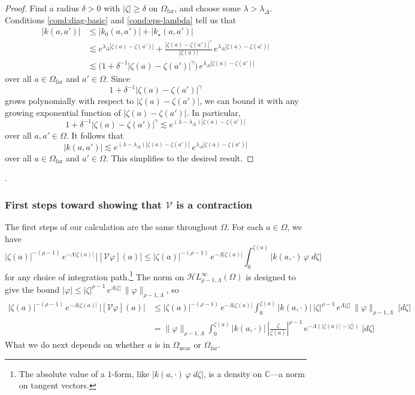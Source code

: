 \documentclass{article}
\theoremstyle{plain}
\newcommand{\C}{\mathbb{C}}
\newcommand{\singexp}[2]{\mathcal{H}L^\infty_{#1, #2}}
\newcommand{\volterra}{\mathcal{V}}
\newcommand{\kerwhole}{k}
\newcommand{\hardker}{k_0}
\newcommand{\softker}{k_\star}
\newcommand{\domain}{\Omega}
\newcommand{\near}{\Omega_\text{near}}
\newcommand{\far}{\Omega_\text{far}}
\begin{document}
\begin{proof}
Find a radius $\delta > 0$ with $|\zeta| \ge \delta$ on $\domain_\text{far}$, and choose some $\lambda > \lambda_\Delta$. Conditions \eqref{cond:diag-basic} and \eqref{cond:eps-lambda} tell us that
\begin{align*}
|\kerwhole(a,a')|&\leq |\hardker(a,a')| + |\softker(a,a')|\\
&\lesssim e^{\lambda_\Delta |\zeta(a)-\zeta(a')|} + \frac{|\zeta(a)-\zeta(a')|^\gamma}{|\zeta(a)|}\,e^{\lambda_\Delta|\zeta(a)-\zeta(a')|}\\
&\lesssim \big(1 + \delta^{-1} |\zeta(a)-\zeta(a')|^\gamma \big) \, e^{\lambda_\Delta|\zeta(a)-\zeta(a')|}
\end{align*}
over all $a \in \domain_\text{far}$ and $a' \in \domain$. Since
\[ 1 + \delta^{-1}|\zeta(a)-\zeta(a')|^\gamma \]
grows polynomially with respect to $|\zeta(a)-\zeta(a')|$, we can bound it with any growing exponential function of $|\zeta(a)-\zeta(a')|$. In particular,
\[ 1 + \delta^{-1}|\zeta(a)-\zeta(a')|^\gamma \lesssim e^{(\lambda - \lambda_\Delta) |\zeta(a)-\zeta(a')|} \]
over all $a, a' \in \domain$. It follows that
\[ |\kerwhole(a,a')| \lesssim e^{(\lambda - \lambda_\Delta) |\zeta(a)-\zeta(a')|} \, e^{\lambda_\Delta|\zeta(a)-\zeta(a')|} \]
over all $a \in \domain_\text{far}$ and $a' \in \domain$. This simplifies to the desired result.
\end{proof}.
\subsubsection{First steps toward showing that $\volterra$ is a contraction}\label{first-steps}
The first steps of our calculation are the same throughout $\domain$. For each $a \in \domain$, we have
\[ |\zeta(a)|^{-(\rho-1)}\,e^{-\Lambda|\zeta(a)|}\,|[\volterra\varphi](a)| \le |\zeta(a)|^{-(\rho-1)}\,e^{-\Lambda|\zeta(a)|} \int_0^{\zeta(a)} |k(a, \cdot)\,\varphi\;d\zeta| \]
for any choice of integration path.\footnote{The absolute value of a $1$-form, like $|k(a, \cdot)\,\varphi\;d\zeta|$, is a density on $\C$---a norm on tangent vectors.} The norm on $\singexp{\rho-1}{\Lambda}(\domain)$ is designed to give the bound $|\varphi| \le |\zeta|^{\rho-1}\,e^{\Lambda |\zeta|}\,\|\varphi\|_{\rho-1, \Lambda}$, so
\begin{align*}
|\zeta(a)|^{-(\rho-1)}\,e^{-\Lambda|\zeta(a)|}\,|[\volterra\varphi](a)| & \le |\zeta(a)|^{-(\rho-1)}\,e^{-\Lambda|\zeta(a)|} \int_0^{\zeta(a)} |k(a, \cdot)|\,|\zeta|^{\rho-1}\,e^{\Lambda |\zeta|}\,\|\varphi\|_{\rho-1, \Lambda}\;|d\zeta| \\
& = \|\varphi\|_{\rho-1, \Lambda} \int_0^{\zeta(a)} |k(a, \cdot)|\,\left|\frac{\zeta}{\zeta(a)}\right|^{\rho-1}\,e^{-\Lambda(|\zeta(a)| - |\zeta|)}\;|d\zeta|
\end{align*}
What we do next depends on whether $a$ is in $\near$ or $\far$.
\end{document}
